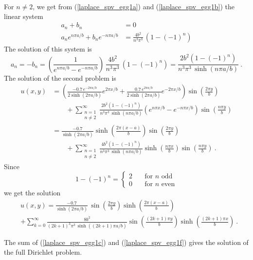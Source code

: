 \begin{egg}
For $n\neq 2$, we get from (\ref{laplace_spv_egg1a}) and
(\ref{laplace_spv_egg1b}) the linear system
\begin{align*}
a_n + b_n &= 0 \\
a_n e^{n\pi a/b} + b_n e^{-n\pi a/b} &=
\frac{4b^2}{n^3\pi^3}\,\left( 1 - (-1)^n\right)
\end{align*}
The solution of this system is
\[
a_n = -b_n = \left(\frac{1}{e^{n\pi a/b} - e^{-n\pi a/b}}\right)\,
\frac{4b^2}{n^3\pi^3}\,\left(1- (-1)^n\right)
= \frac{2b^2 \left(1- (-1)^n\right)}{n^3\pi^3\,\sinh(n\pi a/b)} \ .
\]
The solution of the second problem is
\begin{align*}
  u(x,y) &=
\left( \frac{-0.7\,e^{-2\pi a/b}}{2\sinh(2\pi a/b)} e^{2\pi x/b}
+ \frac{0.7\,e^{2\pi a/b}}{2\sinh(2\pi a/b)} e^{-2\pi x/b} \right)
\sin\left(\frac{2 \pi y }{b}\right) \\
&\qquad + \sum_{\substack{n=1\\n\neq 2}}^\infty
\frac{2b^2 \left(1- (-1)^n\right)}{n^3\pi^3\,\sinh(n\pi a/b)}
\left(e^{n\pi x/b} - e^{-n\pi x/b}\right)\sin\left(\frac{n\pi y}{b}\right) \\
&= \frac{-0.7}{\sinh(2\pi a/b)}\sinh\left(\frac{2\pi(x-a)}{b}\right)
\sin\left(\frac{2 \pi y }{b}\right) \\
&\qquad + \sum_{\substack{n=1\\n\neq 2}}^\infty
\frac{4b^2 \left(1- (-1)^n\right)}{n^3\pi^3\,\sinh(n\pi a/b)}
\sinh\left(\frac{n\pi x}{b}\right)\sin\left(\frac{n\pi y}{b}\right) \ .
\end{align*}
Since
\[
1-(-1)^n =
\begin{cases}
2 & \quad \text{for $n$ odd} \\
0 & \quad \text{for $n$ even}
\end{cases}
\]
we get the solution
\begin{align}
&u(x,y)
= \frac{-0.7}{\sinh(2\pi a/b)}\,\sin\left(\frac{2\pi y}{b}\right)
\sinh\left(\frac{2\pi (x-a)}{b}\right) \nonumber \\
&+ \sum_{k=0}^\infty \frac{8b^2}{(2k+1)^3\pi^3\,
\sinh((2k+1)\pi a/b)}
\sin\left(\frac{(2k+1)\pi y}{b}\right)\sinh\left(\frac{(2k+1)\pi x}{b}\right)
\ .  \label{laplace_spv_egg1f}
\end{align}

The sum of (\ref{laplace_spv_egg1c}) and (\ref{laplace_spv_egg1f}) gives the
solution of the full Dirichlet problem.
\end{egg}

